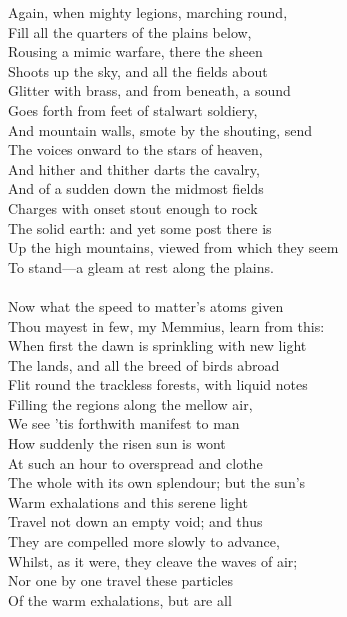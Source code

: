 Again, when mighty legions, marching round,\\
Fill all the quarters of the plains below,\\
Rousing a mimic warfare, there the sheen\\
Shoots up the sky, and all the fields about\\
Glitter with brass, and from beneath, a sound\\
Goes forth from feet of stalwart soldiery,\\
And mountain walls, smote by the shouting, send\\
The voices onward to the stars of heaven,\\
And hither and thither darts the cavalry,\\
And of a sudden down the midmost fields\\
Charges with onset stout enough to rock\\
The solid earth: and yet some post there is\\
Up the high mountains, viewed from which they seem\\
To stand—a gleam at rest along the plains.\\
\\
Now what the speed to matter's atoms given\\
Thou mayest in few, my Memmius, learn from this:\\
When first the dawn is sprinkling with new light\\
The lands, and all the breed of birds abroad\\
Flit round the trackless forests, with liquid notes\\
Filling the regions along the mellow air,\\
We see 'tis forthwith manifest to man\\
How suddenly the risen sun is wont\\
At such an hour to overspread and clothe\\
The whole with its own splendour; but the sun's\\
Warm exhalations and this serene light\\
Travel not down an empty void; and thus\\
They are compelled more slowly to advance,\\
Whilst, as it were, they cleave the waves of air;\\
Nor one by one travel these particles\\
Of the warm exhalations, but are all\\
